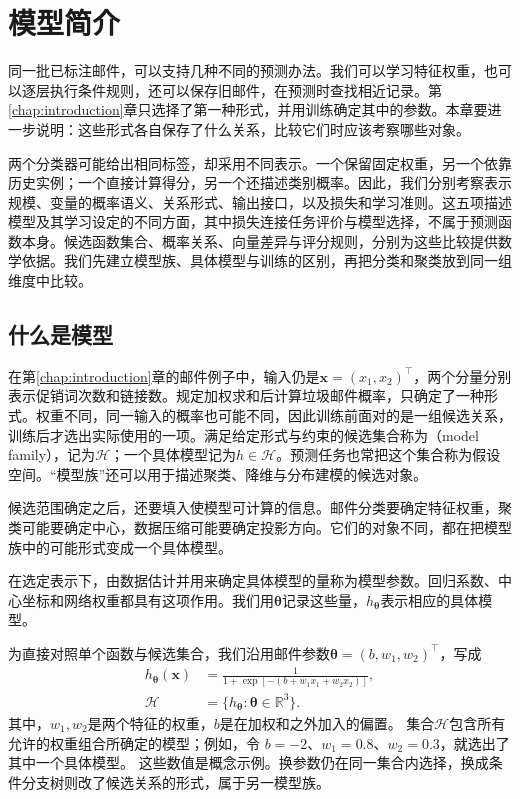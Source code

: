 \chapter{模型简介}
\label{chap:machine-learning-models}

同一批已标注邮件，可以支持几种不同的预测办法。我们可以学习特征权重，也可以逐层执行条件规则，还可以保存旧邮件，在预测时查找相近记录。第\ref{chap:introduction}章只选择了第一种形式，并用训练确定其中的参数。本章要进一步说明：这些形式各自保存了什么关系，比较它们时应该考察哪些对象。

两个分类器可能给出相同标签，却采用不同表示。一个保留固定权重，另一个依靠历史实例；一个直接计算得分，另一个还描述类别概率。因此，我们分别考察表示规模、变量的概率语义、关系形式、输出接口，以及损失和学习准则。这五项描述模型及其学习设定的不同方面，其中损失连接任务评价与模型选择，不属于预测函数本身。候选函数集合、概率关系、向量差异与评分规则，分别为这些比较提供数学依据。我们先建立模型族、具体模型与训练的区别，再把分类和聚类放到同一组维度中比较。

\section{什么是模型}
\label{sec:models-meaning}

在第\ref{chap:introduction}章的邮件例子中，输入仍是$\bm{x}=(x_1,x_2)^{\top}$，两个分量分别表示促销词次数和链接数。规定加权求和后计算垃圾邮件概率，只确定了一种形式。权重不同，同一输入的概率也可能不同，因此训练前面对的是一组候选关系，训练后才选出实际使用的一项。满足给定形式与约束的候选集合称为（model family），记为$\mathcal H$；一个具体模型记为$h\in\mathcal H$。预测任务也常把这个集合称为假设空间。“模型族”还可以用于描述聚类、降维与分布建模的候选对象。

候选范围确定之后，还要填入使模型可计算的信息。邮件分类要确定特征权重，聚类可能要确定中心，数据压缩可能要确定投影方向。它们的对象不同，都在把模型族中的可能形式变成一个具体模型。

在选定表示下，由数据估计并用来确定具体模型的量称为模型参数。回归系数、中心坐标和网络权重都具有这项作用。我们用$\bm{\theta}$记录这些量，$h_{\bm{\theta}}$表示相应的具体模型。

为直接对照单个函数与候选集合，我们沿用邮件参数$\bm{\theta}=(b,w_1,w_2)^{\top}$，写成
\begin{equation}
  \begin{aligned}
    h_{\bm{\theta}}(\bm{x})
      &=\frac{1}{1+\exp[-(b+w_1x_1+w_2x_2)]},\\
    \mathcal{H}&=\{h_{\bm{\theta}}:\bm{\theta}\in\mathbb{R}^{3}\}.
  \end{aligned}
  \label{eq:models-family-example}
\end{equation}
其中，$w_1,w_2$是两个特征的权重，$b$是在加权和之外加入的偏置。
集合$\mathcal{H}$包含所有允许的权重组合所确定的模型；例如，令
$b=-2$、$w_1=0.8$、$w_2=0.3$，就选出了其中一个具体模型。
这些数值是概念示例。换参数仍在同一集合内选择，换成条件分支树则改了候选关系的形式，属于另一模型族。


